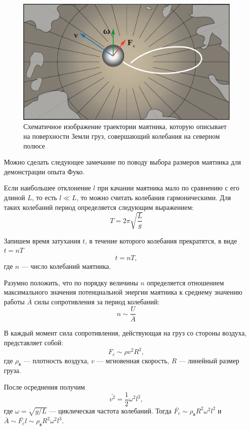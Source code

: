 \documentclass[All.tex]{subfiles}
\begin{document}
	\begin{figure}[H] 	
		\centering 	
		\includegraphics[width=0.65\linewidth]{fuko-5.png}
		\caption{Схематичное изображение траектории маятника, которую описывает на поверхности Земли груз, совершающий колебания на северном полюсе}
		\label{fuko-5}
	\end{figure}
	
	Можно сделать следующее замечание по поводу выбора размеров маятника для демонстрации опыта Фуко. 
	
	Если наибольшее отклонение $ l $ при качании маятника мало по сравнению с его длиной $ L $, то есть $ l \ll L $, то можно считать колебания гармоническими.
	Для таких колебаний период определяется следующим выражением:
	\begin{equation}\label{fuko-1eq1}
	T = 2\pi \sqrt{\frac{L}{g}}
	\end{equation}
	
	Запишем время затухания $ t $, в течение которого колебания прекратятся, в виде $ t = nT $
	\begin{equation}\label{fuko-1eq2}
	t = nT,
	\end{equation}
	где $ n $ — число колебаний маятника.
	
	Разумно положить, что по порядку величины $ n $ определяется отношением максимального значения потенциальной энергии маятника к среднему значению работы $ \bar{A} $ силы сопротивления за период колебаний:
	 \begin{equation}\label{fuko-1eq3}
	 n \sim \frac{U}{\bar{A}}
	 \end{equation}
	 
	В каждый момент сила сопротивления, действующая на груз со стороны воздуха, представляет собой:
	\begin{equation}\label{fuko-1eq4}
	F_{c} \sim \rho v^{2}R^{2},
	\end{equation}
	где $ \rho_{\text{в}} $ — плотность воздуха, $ v $ — мгновенная скорость, $ R $ — линейный размер груза.
	
	После осреднения получим
	\begin{equation}\label{fuko-1eq5}
	\bar{v^{2}} = \frac{1}{2}\omega^{2}l^{2},
	\end{equation}
	где $ \omega = \sqrt{g/L} $ — циклическая частота колебаний.
	Тогда $ \bar{F_{c}}  \sim \rho_{\text{в}} R^{2}\omega^{2}l^{2} $ и $ \bar{A} \sim  \bar{F_{c}} l \sim \rho_{\text{в}} R^{2}\omega^{2}l^3 $.
	
\end{document}
